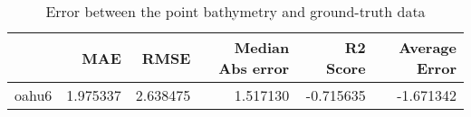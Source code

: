 \begin{table}[h!]
\caption{Error between the point bathymetry and ground-truth data}
\label{tab:oahu6_lidar_error}
\begin{tabular}{lrrrrr}
\toprule
 & MAE & RMSE & Median Abs error & R2 Score & Average Error \\
\midrule
oahu6 & 1.975337 & 2.638475 & 1.517130 & -0.715635 & -1.671342 \\
\bottomrule
\end{tabular}
\end{table}
